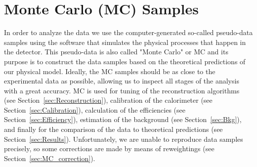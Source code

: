 \chapter{Monte Carlo (MC) Samples}
\label{sec:MCSamples}

In order to analyze the data we use the computer-generated so-called pseudo-data samples using the software that simulates the physical processes that happen in the detector. This pseudo-data is also called "Monte Carlo" or MC and its purpose is to construct the data samples based on the theoretical predictions of our physical model. Ideally, the MC samples should be as close to the experimental data as possible, allowing us to inspect all stages of the analysis with a great accuracy. MC is used for tuning of the reconstruction algorithms (see Section~\ref{sec:Reconstruction}), calibration of the calorimeter (see Section~\ref{sec:Calibration}), calculation of the efficiencies (see Section~\ref{sec:Efficiency}), estimation of the background (see Section~\ref{sec:Bkg}), and finally for the comparison of the data to theoretical predictions (see Section~\ref{sec:Results}). Unfortunately, we are unable to reproduce data samples precisely, so some corrections are made by means of reweightings (see Section~\ref{sec:MC_correction}).

\begin{figure}
\end{figure}

